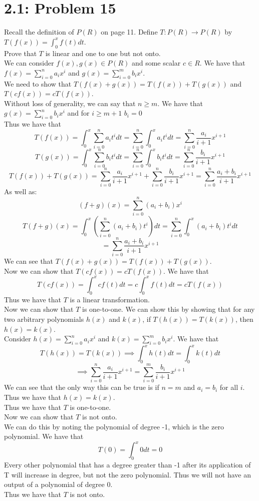 \documentclass[answers,12pt,addpoints]{exam}
\begin{document}
\section*{2.1: Problem 15}
Recall the definition of $P(R)$ on page 11. Define 
$T: P(R) \to P(R)$ by $T(f(x)) = \int_0^x f(t)dt$.\\
Prove that $T$ is linear and one to one but not onto.\\
We can consider $f(x), g(x) \in P(R)$ and some scalar $c \in R$. We have that
$f(x) = \sum_{i=0}^n a_ix^i$ and $g(x) = \sum_{i=0}^m b_ix^i$. \\
We need to show that $T(f(x) + g(x)) = T(f(x)) + T(g(x))$ and $T(cf(x)) = cT(f(x))$.\\
Without loss of generality, we can say that $n \geq m$. We have that
$g(x) = \sum_{i=0}^n b_ix^i$ and for $i \geq m+1$ $b_i = 0$\\
Thus we have that
$$T(f(x)) = \int_0^x \sum_{i=0}^n a_it^i dt = \sum_{i=0}^n \int_0^x a_it^i dt = \sum_{i=0}^n \frac{a_i}{i+1}x^{i+1}$$
$$T(g(x)) = \int_0^x \sum_{i=0}^n b_it^i dt = \sum_{i=0}^n \int_0^x b_it^i dt = \sum_{i=0}^n \frac{b_i}{i+1}x^{i+1}$$
$$T(f(x)) + T(g(x)) = \sum_{i=0}^n \frac{a_i}{i+1}x^{i+1} + \sum_{i=0}^n \frac{b_i}{i+1}x^{i+1} = \sum_{i=0}^n \frac{a_i + b_i}{i+1}x^{i+1} $$
As well as:
$$(f+g)(x) = \sum_{i=0}^n (a_i + b_i)x^i$$
$$T(f+g)(x) = \int_0^x \left( \sum_{i=0}^n (a_i + b_i)t^i  \right) dt = \sum_{i=0}^n \int_0^x (a_i + b_i)t^i dt$$
$$ = \sum_{i=0}^n \frac{a_i + b_i}{i+1}x^{i+1}$$
We can see that $T(f(x) + g(x)) = T(f(x)) + T(g(x))$.\\
Now we can show that $T(cf(x)) = cT(f(x))$. We have that
$$T(cf(x)) = \int_0^x cf(t)dt = c\int_0^x f(t)dt = cT(f(x))$$
Thus we have that $T$ is a linear transformation.\\
Now we can show that $T$ is one-to-one. We can show this by showing that for any two arbitrary polynomials $h(x)$ and $k(x)$, if $T(h(x)) = T(k(x))$, then $h(x) = k(x)$. \\
Consider $h(x) = \sum_{i=0}^n a_ix^i$ and $k(x) = \sum_{i=0}^m b_ix^i$. We have that
$$T(h(x)) = T(k(x)) \implies \int_0^x h(t)dt = \int_0^x k(t)dt$$
$$\implies \sum_{i=0}^n \frac{a_i}{i+1}x^{i+1} = \sum_{i=0}^m \frac{b_i}{i+1}x^{i+1}$$
We can see that the only way this can be true is if $n = m$ and $a_i = b_i$ for all $i$. Thus we have that $h(x) = k(x)$.\\
Thus we have that $T$ is one-to-one.\\
Now we can show that $T$ is not onto. \\
We can do this by noting the polynomial of degree -1, which is the zero polynomial. We have that
$$T(0) = \int_0^x 0dt = 0$$
Every other polynomial that has a degree greater than -1 after its application of T will increase in degree, but not the zero polynomial. Thus we will not have an output of a polynomial of degree 0.\\
Thus we have that $T$ is not onto.\\
\end{document}
